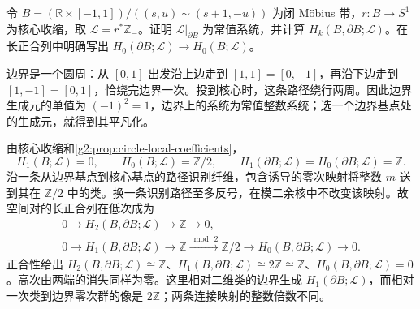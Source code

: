 \begin{exercise}\label{g2:ex:moebius-relative-orientation}
	令 \(B=(\mathbb R\times[-1,1])/((s,u)\sim(s+1,-u))\) 为闭 Möbius 带，\(r:B\to S^1\) 为核心收缩，取 \(\mathcal L=r^*\mathbb Z_{-}\)。证明 \(\mathcal L|_{\partial B}\) 为常值系统，并计算 \(H_k(B,\partial B;\mathcal L)\)。在长正合列中明确写出 \(H_0(\partial B;\mathcal L)\to H_0(B;\mathcal L)\)。
\end{exercise}
\begin{solution}
	边界是一个圆周：从 \([0,1]\) 出发沿上边走到 \([1,1]=[0,-1]\)，再沿下边走到 \([1,-1]=[0,1]\)，恰绕完边界一次。投到核心时，这条路径绕行两周。因此边界生成元的单值为 \((-1)^2=1\)，边界上的系统为常值整数系统；选一个边界基点处的生成元，就得到其平凡化。

	由核心收缩和\cref{g2:prop:circle-local-coefficients}，
	\[
		H_1(B;\mathcal L)=0,\qquad H_0(B;\mathcal L)=\mathbb Z/2,\qquad
		H_1(\partial B;\mathcal L)=H_0(\partial B;\mathcal L)=\mathbb Z.
	\]
	沿一条从边界基点到核心基点的路径识别纤维，包含诱导的零次映射将整数 \(m\) 送到其在 \(\mathbb Z/2\) 中的类。换一条识别路径至多反号，在模二余核中不改变该映射。故空间对的长正合列在低次成为
	\[
		\begin{aligned}
			0\longrightarrow H_2(B,\partial B;\mathcal L)\longrightarrow\mathbb Z\longrightarrow0,\\
			0\longrightarrow H_1(B,\partial B;\mathcal L)\longrightarrow\mathbb Z\xrightarrow{\bmod\,2}\mathbb Z/2
			\longrightarrow H_0(B,\partial B;\mathcal L)\longrightarrow0.
		\end{aligned}
	\]
	正合性给出 \(H_2(B,\partial B;\mathcal L)\cong\mathbb Z\)、\(H_1(B,\partial B;\mathcal L)\cong2\mathbb Z\cong\mathbb Z\)、\(H_0(B,\partial B;\mathcal L)=0\)。高次由两端的消失同样为零。这里相对二维类的边界生成 \(H_1(\partial B;\mathcal L)\)，而相对一次类到边界零次群的像是 \(2\mathbb Z\)；两条连接映射的整数倍数不同。
\end{solution}

